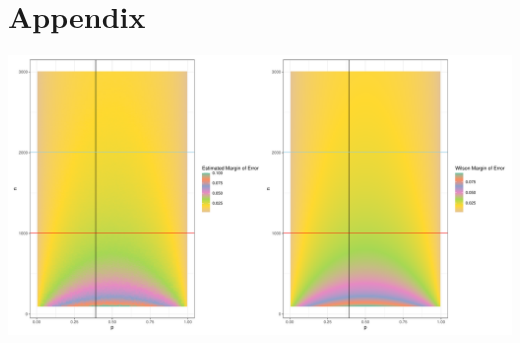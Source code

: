 \documentclass{article}\usepackage[]{graphicx}\usepackage[]{xcolor}
\newenvironment{Figure}
  {\par\medskip\noindent\minipage{\linewidth}}
  {\endminipage\par\medskip}
\begin{document}
\begin{multicols}{2}
\vspace{2em}
\begin{tiny}

\end{tiny}
\end{multicols}

\newpage
\onecolumn
\section{Appendix}

\begin{Figure}
\includegraphics[scale=0.5]{Rplot02.pdf}
\label{plot3}
\end{Figure}
\end{document}
